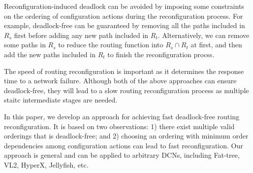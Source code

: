 Reconfiguration-induced deadlock can be avoided by imposing some constraints on the ordering of configuration actions during the reconfiguration process. For example, deadlock-free can be guaranteed by removing all the paths included in $R_s$ first before adding any new path included in $R_t$. Alternatively, we can remove some paths in $R_s$ to reduce the routing function into $R_s \cap R_t$ at first, and then add the new paths included in $R_t$ to finish the reconfiguration procss. 

The speed of routing reconfiguration is important as it determines the response time to a network failure. Although both of the above approaches can ensure deadlock-free, they will lead to a slow routing reconfiguration process as multiple staitc intermediate stages are needed. 

In this paper, we  develop an approach for achieving fast deadlock-free routing reconfiguration. It is based on two observations: 1) there exist multiple  
valid orderings that is deadlock-free; and 2) choosing an ordering with minimum order dependencies among configuration actions can lead to fast reconfiguration. Our approach is general and can be applied to arbitrary DCNs, including Fat-tree, VL2, HyperX, Jellyfish, etc.


